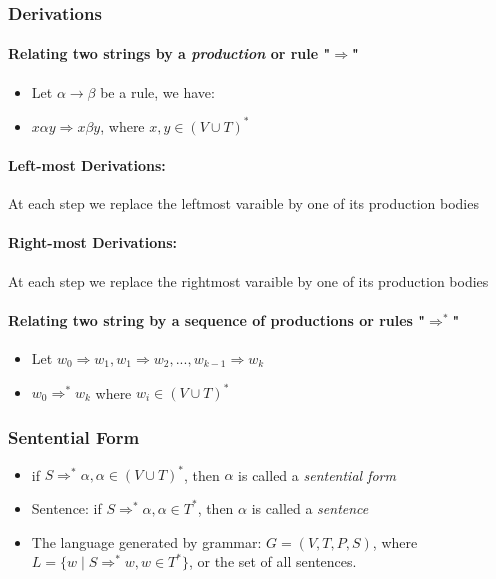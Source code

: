 \documentclass[20pt]{article} %
\begin{document}
\subsubsection{Derivations}
\paragraph{Relating two strings by a \textit{production} or rule "$\Rightarrow$"}
\begin{itemize}
\item Let $\alpha \rightarrow \beta$ be a rule, we have:
\item $x\alpha y \Rightarrow x\beta y$, where $x,y \in (V \cup T)^{*}$
\end{itemize}
\paragraph{Left-most Derivations:} At each step we replace the leftmost varaible by one of its production bodies
\paragraph{Right-most Derivations:} At each step we replace the rightmost varaible by one of its production bodies
\paragraph{Relating two string by a sequence of productions or rules "$\Rightarrow^{*}$"}
\begin{itemize}
\item Let $w_0 \Rightarrow w_1, w_1 \Rightarrow w_2, ..., w_{k-1} \Rightarrow w_k$
\item $w_0 \Rightarrow^{*} w_k$ where $w_i \in (V \cup T)^{*}$
\end{itemize}
\subsubsection{Sentential Form}
\begin{itemize}
\item if $S \Rightarrow^{*} \alpha, \alpha \in (V \cup T)^{*}$, then $\alpha$ is called a \textit{sentential form}
\item Sentence: if $S \Rightarrow^{*} \alpha, \alpha \in T^{*}$, then $\alpha$ is called a \textit{sentence}
\item The language generated by grammar: $G = (V, T, P, S)$, where $L = \{ w \mid S \Rightarrow^{*} w, w \in T^{*} \}$, or the set of all sentences.
\end{itemize}
\end{document}
